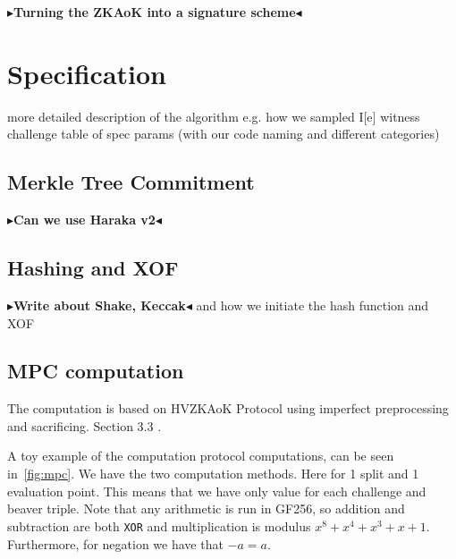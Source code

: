 \documentclass[twoside,11pt,openright]{report}
\theoremstyle{definition}
\theoremstyle{plain}
\newcommand{\todo}[1]{{\color[rgb]{.5,0,0}\textbf{$\blacktriangleright$#1$\blacktriangleleft$}}}
\begin{document}
\todo{Turning the ZKAoK into a signature scheme}


\chapter{Specification}
\label{ch:spec}
more detailed description of the algorithm
e.g. how we sampled I[e] witness challenge
table of spec params (with our code naming and different categories)

\section{Merkle Tree Commitment}

\todo{Can we use Haraka v2}

\section{Hashing and XOF}

\todo{Write about Shake, Keccak} and how we initiate the hash function and XOF

\section{MPC computation}

The computation is based on HVZKAoK Protocol using imperfect preprocessing and sacrificing. Section 3.3 \cite{baum2020concretely}.

A toy example of the computation protocol computations, can be seen in~\autoref{fig:mpc}. We have the two computation methods. Here for 1 split and 1 evaluation point. This means that we have only value for each challenge and beaver triple. Note that any arithmetic is run in GF256, so addition and subtraction are both \texttt{XOR} and multiplication is modulus $x^8 + x^4 + x^3 + x + 1$. Furthermore, for negation we have that $-a = a$.
\end{document}
